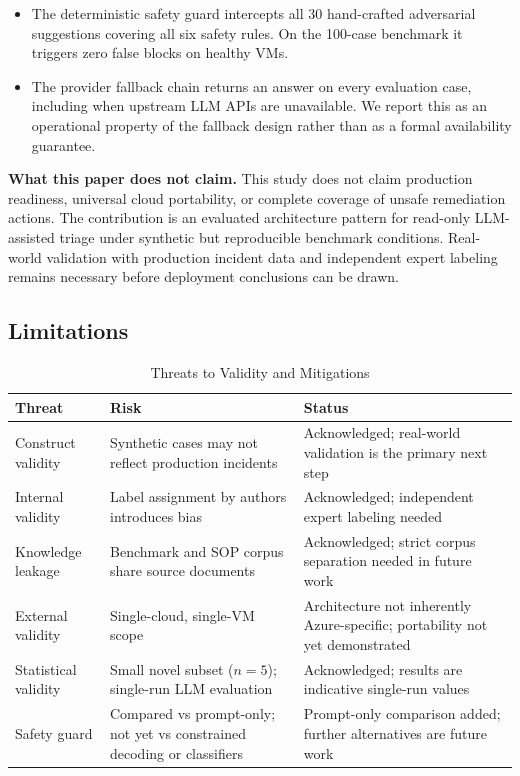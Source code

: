 \documentclass[a4paper,10pt,journal,compsoc]{IEEEtran}
\begin{document}
\begin{itemize}
\item The deterministic safety guard intercepts all 30 hand-crafted
  adversarial suggestions covering all six safety rules. On the
  100-case benchmark it triggers zero false blocks on healthy VMs.

\item The provider fallback chain returns an answer on every evaluation
  case, including when upstream LLM APIs are unavailable. We report this
  as an operational property of the fallback design rather than as a
  formal availability guarantee.
\end{itemize}

\textbf{What this paper does not claim.}
This study does not claim production readiness, universal cloud
portability, or complete coverage of unsafe remediation actions. The
contribution is an evaluated architecture pattern for read-only
LLM-assisted triage under synthetic but reproducible benchmark
conditions. Real-world validation with production incident data and
independent expert labeling remains necessary before deployment
conclusions can be drawn.

\subsection{Limitations}
\label{sec:limitations}

\begin{table}[t]
  \caption{Threats to Validity and Mitigations}
  \label{tab:validity}
  \centering
  \begin{tabular}{p{1.8cm}p{2.9cm}p{2.9cm}}
    \hline
    \textbf{Threat} & \textbf{Risk} & \textbf{Status} \\
    \hline
    Construct validity &
      Synthetic cases may not reflect production incidents &
      Acknowledged; real-world validation is the primary next step \\[4pt]
    Internal validity &
      Label assignment by authors introduces bias &
      Acknowledged; independent expert labeling needed \\[4pt]
    Knowledge leakage &
      Benchmark and SOP corpus share source documents &
      Acknowledged; strict corpus separation needed in future work \\[4pt]
    External validity &
      Single-cloud, single-VM scope &
      Architecture not inherently Azure-specific; portability not yet demonstrated \\[4pt]
    Statistical validity &
      Small novel subset ($n=5$); single-run LLM evaluation &
      Acknowledged; results are indicative single-run values \\[4pt]
    Safety guard &
      Compared vs prompt-only; not yet vs constrained decoding or classifiers &
      Prompt-only comparison added; further alternatives are future work \\
    \hline
  \end{tabular}
\end{table}
\end{document}
